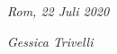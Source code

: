 \documentclass[11pt]{friggeri-cv}
\begin{document}

\vspace{75pt}
\begin{flushleft}
\large\emph{Rom, 22 Juli 2020}
\end{flushleft}
\begin{flushright}
\large\emph{Gessica Trivelli}
\end{flushright}
\end{document}
